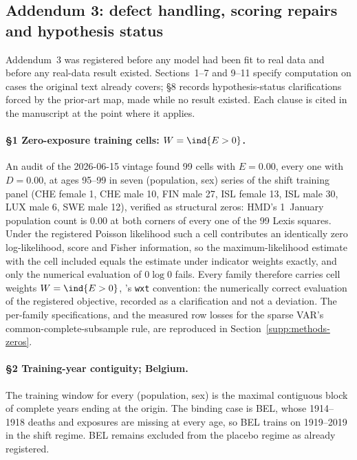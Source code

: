 \subsection{Addendum 3: defect handling, scoring repairs and hypothesis status}
\label{supp:add3}

Addendum~3 was registered before any model had been fit to real data and
before any real-data result existed. Sections~1--7 and 9--11 specify
computation on cases the original text already covers; \S8 records
hypothesis-status clarifications forced by the prior-art map, made while no
result existed. Each clause is cited in the manuscript at the point where it
applies.

\paragraph{\S1 Zero-exposure training cells: $W=\ind\{E>0\}$.} An audit of the
2026-06-15 vintage found 99 cells with $E=0.00$, every one with $D=0.00$, at
ages 95--99 in seven (population, sex) series of the shift training panel
(CHE female 1, CHE male 10, FIN male 27, ISL female 13, ISL male 30, LUX male
6, SWE male 12), verified as structural zeros: HMD's 1~January population
count is 0.00 at both corners of every one of the 99 Lexis squares. Under the
registered Poisson likelihood such a cell contributes an identically zero
log-likelihood, score and Fisher information, so the maximum-likelihood
estimate with the cell included equals the estimate under indicator weights
exactly, and only the numerical evaluation of $0\log 0$ fails. Every family
therefore carries cell weights $W=\ind\{E>0\}$, 's \texttt{wxt}
convention: the numerically correct evaluation of the registered objective,
recorded as a clarification and not a deviation. The per-family
specifications, and the measured row losses for the sparse VAR's
common-complete-subsample rule, are reproduced in
Section~\ref{supp:methods-zeros}.

\paragraph{\S2 Training-year contiguity; Belgium.} The training window for
every (population, sex) is the maximal contiguous block of complete years
ending at the origin. The binding case is BEL, whose 1914--1918 deaths and
exposures are missing at every age, so BEL trains on 1919--2019 in the shift
regime. BEL remains excluded from the placebo regime as already registered.

